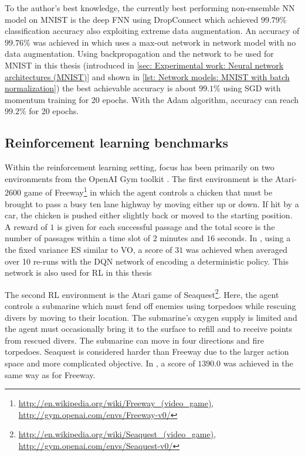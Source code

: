 To the author's best knowledge, the currently best performing non-ensemble \gls{NN} model on \gls{MNIST} is the deep \gls{FNN} using DropConnect \cite{Wan2013, Hasanpour2016} which achieved $99.79\%$ classification accuracy also exploiting extreme data augmentation. An accuracy of $99.76\%$ was achieved in \cite{Chang2015} which uses a max-out network in network \cite{Lin2013} model with no data augmentation. Using backpropagation and the network to be used for \gls{MNIST} in this thesis (introduced in \autoref{sec: Experimental work: Neural network architectures (MNIST)} and shown in \autoref{lst: Network models: MNIST with batch normalization}) the best achievable accuracy is about $99.1\%$ using \gls{SGD} with momentum training for 20 epochs. With the Adam algorithm, accuracy can reach $99.2\%$ for 20 epochs.


\subsection{Reinforcement learning benchmarks}
Within the reinforcement learning setting, focus has been primarily on two environments from the OpenAI Gym toolkit \cite{Brockman2016}. The first environment is the Atari-2600 game of Freeway\footnote{\url{http://en.wikipedia.org/wiki/Freeway_(video_game)}, \url{http://gym.openai.com/envs/Freeway-v0/}} in which the agent controls a chicken that must be brought to pass a busy ten lane highway by moving either up or down. If hit by a car, the chicken is pushed either slightly back or moved to the starting position. A reward of $1$ is given for each successful passage and the total score is the number of passages within a time slot of $2$ minutes and $16$ seconds. In \cite{Salimans2017}, using a the fixed variance \gls{ES} similar to \gls{VO}, a score of $31$ was achieved when averaged over 10 re-runs with the DQN network of \cite{Mnih2016} encoding a deterministic policy. This network is also used for \gls{RL} in this thesis

The second \gls{RL} environment is the Atari game of Seaquest\footnote{\url{http://en.wikipedia.org/wiki/Seaquest_(video_game)}, \url{http://gym.openai.com/envs/Seaquest-v0/}}. Here, the agent controls a submarine which must fend off enemies using torpedoes while rescuing divers by moving to their location. The submarine's oxygen supply is limited and the agent must occasionally bring it to the surface to refill and to receive points from rescued divers. The submarine can move in four directions and fire torpedoes. Seaquest is considered harder than Freeway due to the larger action space and more complicated objective. In \cite{Salimans2017}, a score of $1390.0$ was achieved in the same way as for Freeway.

